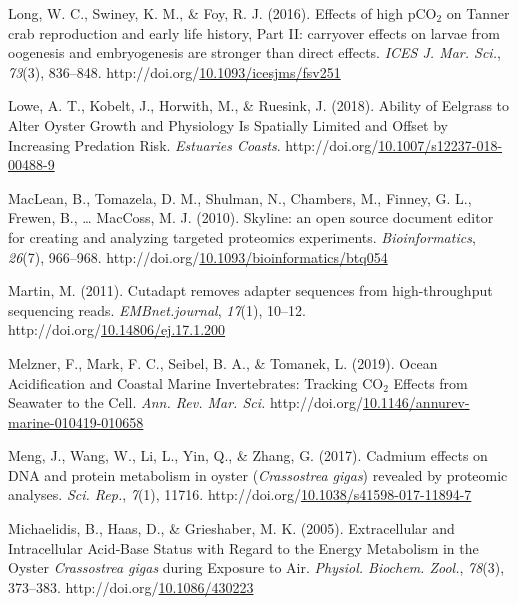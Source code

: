 \documentclass [11pt, proquest] {uwthesis}[2015/03/03]
\newlength{\cslhangindent}
\newenvironment{CSLReferences}%
{\setlength{\parindent}{0pt}%
\everypar{\setlength{\hangindent}{\cslhangindent}}\ignorespaces}%
{\par}
\begin{document}
\begin{CSLReferences}{1}{0}
\leavevmode\hypertarget{ref-Long2016}{}%
Long, W. C., Swiney, K. M., \& Foy, R. J. (2016). {Effects of high {pCO\(_2\)} on Tanner crab reproduction and early life history, Part II: carryover effects on larvae from oogenesis and embryogenesis are stronger than direct effects}. \emph{ICES J. Mar. Sci.}, \emph{73}(3), 836--848. http://doi.org/\href{https://doi.org/10.1093/icesjms/fsv251}{10.1093/icesjms/fsv251}

\leavevmode\hypertarget{ref-Lowe2018}{}%
Lowe, A. T., Kobelt, J., Horwith, M., \& Ruesink, J. (2018). {Ability of Eelgrass to Alter Oyster Growth and Physiology Is Spatially Limited and Offset by Increasing Predation Risk}. \emph{Estuaries Coasts}. http://doi.org/\href{https://doi.org/10.1007/s12237-018-00488-9}{10.1007/s12237-018-00488-9}

\leavevmode\hypertarget{ref-MacLean2010}{}%
MacLean, B., Tomazela, D. M., Shulman, N., Chambers, M., Finney, G. L., Frewen, B., \ldots{} MacCoss, M. J. (2010). {Skyline: an open source document editor for creating and analyzing targeted proteomics experiments}. \emph{Bioinformatics}, \emph{26}(7), 966--968. http://doi.org/\href{https://doi.org/10.1093/bioinformatics/btq054}{10.1093/bioinformatics/btq054}

\leavevmode\hypertarget{ref-Martin2011}{}%
Martin, M. (2011). {Cutadapt removes adapter sequences from high-throughput sequencing reads}. \emph{EMBnet.journal}, \emph{17}(1), 10--12. http://doi.org/\href{https://doi.org/10.14806/ej.17.1.200}{10.14806/ej.17.1.200}

\leavevmode\hypertarget{ref-Melzner2019}{}%
Melzner, F., Mark, F. C., Seibel, B. A., \& Tomanek, L. (2019). {Ocean Acidification and Coastal Marine Invertebrates: Tracking {CO\(_2\)} Effects from Seawater to the Cell}. \emph{Ann. Rev. Mar. Sci.} http://doi.org/\href{https://doi.org/10.1146/annurev-marine-010419-010658}{10.1146/annurev-marine-010419-010658}

\leavevmode\hypertarget{ref-Meng2017}{}%
Meng, J., Wang, W., Li, L., Yin, Q., \& Zhang, G. (2017). {Cadmium effects on DNA and protein metabolism in oyster (\emph{Crassostrea gigas}) revealed by proteomic analyses}. \emph{Sci. Rep.}, \emph{7}(1), 11716. http://doi.org/\href{https://doi.org/10.1038/s41598-017-11894-7}{10.1038/s41598-017-11894-7}

\leavevmode\hypertarget{ref-Michaelidis2005}{}%
Michaelidis, B., Haas, D., \& Grieshaber, M. K. (2005). {Extracellular and Intracellular Acid‐Base Status with Regard to the Energy Metabolism in the Oyster \emph{Crassostrea gigas} during Exposure to Air}. \emph{Physiol. Biochem. Zool.}, \emph{78}(3), 373--383. http://doi.org/\href{https://doi.org/10.1086/430223}{10.1086/430223}


\end{CSLReferences}
\end{document}
